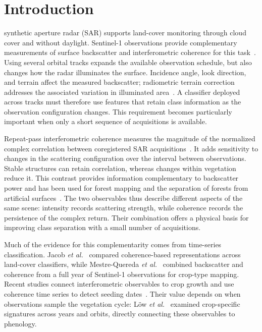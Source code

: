 \section{Introduction}
\label{sec:related}
 synthetic aperture radar (SAR) supports land-cover monitoring through cloud cover and without daylight. Sentinel-1 observations provide complementary measurements of surface backscatter and interferometric coherence for this task~\cite{Jacob2020,Sica2019}. Using several orbital tracks expands the available observation schedule, but also changes how the radar illuminates the surface. Incidence angle, look direction, and terrain affect the measured backscatter; radiometric terrain correction addresses the associated variation in illuminated area~\cite{Small2011}. A classifier deployed across tracks must therefore use features that retain class information as the observation configuration changes. This requirement becomes particularly important when only a short sequence of acquisitions is available.

Repeat-pass interferometric coherence measures the magnitude of the normalized complex correlation between coregistered SAR acquisitions~\cite{Bamler1998,Touzi1999}. It adds sensitivity to changes in the scattering configuration over the interval between observations. Stable structures can retain correlation, whereas changes within vegetation reduce it. This contrast provides information complementary to backscatter power and has been used for forest mapping and the separation of forests from artificial surfaces~\cite{Sica2019,Zhuang2024,Aghababaei2026}. The two observables thus describe different aspects of the same scene: intensity records scattering strength, while coherence records the persistence of the complex return. Their combination offers a physical basis for improving class separation with a small number of acquisitions.

Much of the evidence for this complementarity comes from time-series classification. Jacob \textit{et al.}~\cite{Jacob2020} compared coherence-based representations across land-cover classifiers, while Mestre-Quereda \textit{et al.}~\cite{MestreQuereda2020} combined backscatter and coherence from a full year of Sentinel-1 observations for crop-type mapping. Recent studies connect interferometric observables to crop growth and use coherence time series to detect seeding dates~\cite{Yuan2024,ChenX2025}. Their value depends on when observations sample the vegetation cycle: L\"ow \textit{et al.}~\cite{Low2024} examined crop-specific signatures across years and orbits, directly connecting these observables to phenology.


